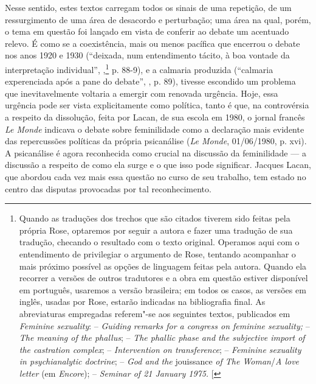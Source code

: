 Nesse sentido, estes textos carregam todos os sinais de uma repetição,
de um ressurgimento de uma área de desacordo e perturbação; uma área na
qual, porém, o tema em questão foi lançado em vista de conferir ao
debate um acentuado relevo. É como se a coexistência, mais ou menos
pacífica que encerrou o debate nos anos 1920 e 1930 (``deixada, num
entendimento tácito, à boa vontade da interpretação individual'',
,\footnote{Quando as traduções dos trechos que são citados tiverem sido
  feitas pela própria Rose, optaremos por seguir a autora e fazer uma
  tradução de sua tradução, checando o resultado com o texto original.
  Operamos aqui com o entendimento de privilegiar o argumento de Rose,
  tentando acompanhar o mais próximo possível as opções de linguagem
  feitas pela autora. Quando ela recorrer a versões de outros tradutores
  e a obra em questão estiver disponível em português, usaremos a versão
  brasileira; em todos os casos, as versões em inglês, usadas por Rose,
  estarão indicadas na bibliografia final. As abreviaturas empregadas
  referem"-se aos seguintes textos, publicados em \emph{Feminine
  sexuality}:  -- \emph{Guiding remarks for a congress on feminine
  sexuality;}  -- \emph{The meaning of the phallus};  -- \emph{The
  phallic phase and the subjective import of the castration complex};
   -- \emph{Intervention on transference};  -- \emph{Feminine
  sexuality in psychianalytic doctrine};  -- \emph{God and the}
  jouissance \emph{of The Woman}/\emph{A love letter} (em
  \emph{Encore});  -- \emph{Seminar of 21 January 1975.} {[}\versal{N.~T.}{]}}
p. 88-9), e a calmaria produzida (``calmaria experenciada após a pane
do debate'', , p. 89), tivesse escondido um problema que
inevitavelmente voltaria a emergir com renovada urgência. Hoje, essa
urgência pode ser vista explicitamente como política, tanto é que, na
controvérsia a respeito da dissolução, feita por Lacan, de sua escola em
1980, o jornal francês \emph{Le Monde} indicava o debate sobre
feminilidade como a declaração mais evidente das repercussões políticas
da própria psicanálise (\emph{Le Monde}, 01/06/1980, p.
xvi). A psicanálise é agora reconhecida como crucial na discussão da
feminilidade --- a discussão a respeito de como ela surge e o que isso
pode significar. Jacques Lacan, que abordou cada vez mais essa questão
no curso de seu trabalho, tem estado no centro das disputas provocadas
por tal reconhecimento.

